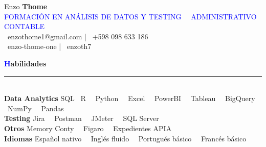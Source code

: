 \documentclass[a4paper,10pt]{article}
\begin{document}
\begin{spacing}{1.1}

\begin{center}
\begin{minipage}{0.2\textwidth}
\end{minipage}%
\begin{minipage}{0.78\textwidth}
\begin{center}
{\Huge  Enzo \textbf{Thome}} \\[2pt]
    \textcolor{blue}{FORMACIÓN EN ANÁLISIS DE DATOS Y TESTING \, \textbullet \, ADMINISTRATIVO CONTABLE} \\[2pt]
    \faEnvelope \, enzothome1@gmail.com | \faPhone \, +598 098 633 186 \\ 
    \faLinkedin \, enzo-thome-one | \faGithub \, enzoth7
    \end{center}
\end{minipage}
\end{center}

\vspace{0.3cm}

\noindent
{\Large\textbf{\textcolor{blue}{H}abilidades}}
\hspace{0.3em}\rule[0.9ex]{\dimexpr\textwidth-9em}{0.4pt} \\[6pt]
\textbf{Data Analytics} \hfill SQL \textbullet \, R \, \textbullet \, Python \, \textbullet \, Excel \, \textbullet \, PowerBI \, \textbullet \, Tableau \, \textbullet \, BigQuery \, \textbullet \, NumPy \, \textbullet \, Pandas \\
\textbf{Testing} \hfill Jira \, \textbullet \, Postman \, \textbullet \, JMeter \, \textbullet \, SQL Server \\ 
\textbf{Otros} \hfill Memory Conty \, \textbullet \, Figaro \, \textbullet \, Expedientes APIA \\ 
\textbf{Idiomas} \hfill Español nativo \, \textbullet \, Inglés fluido \, \textbullet \, Portugués básico \, \textbullet \, Francés básico \\


\end{spacing}
\end{document}

